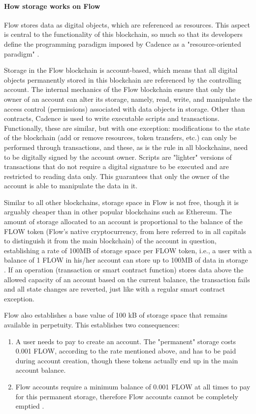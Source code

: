 \documentclass[./4_GeneralApproach.tex]{subfiles}
\begin{document}
    \paragraph{How storage works on Flow}
    Flow stores data as digital objects, which are referenced as resources. This aspect is central to the functionality of this blockchain, so much so that its developers define the programming paradigm imposed by Cadence as a "resource-oriented paradigm" \cite{flow2024}.
    \par
    Storage in the Flow blockchain is account-based, which means that all digital objects permanently stored in this blockchain are referenced by the controlling account. The internal mechanics of the Flow blockchain ensure that only the owner of an account can alter its storage, namely, read, write, and manipulate the access control (permissions) associated with data objects in storage. Other than contracts, Cadence is used to write executable scripts and transactions. Functionally, these are similar, but with one exception: modifications to the state of the blockchain (add or remove resources, token transfers, etc.) can only be performed through transactions, and these, as is the rule in all blockchains, need to be digitally signed by the account owner. Scripts are "lighter" versions of transactions that do not require a digital signature to be executed and are restricted to reading data only. This guarantees that only the owner of the account is able to manipulate the data in it.
    \par
    Similar to all other blockchains, storage space in Flow is not free, though it is arguably cheaper than in other popular blockchains such as Ethereum. The amount of storage allocated to an account is proportional to the balance of the FLOW token (Flow's native cryptocurrency, from here referred to in all capitals to distinguish it from the main blockchain) of the account in question, establishing a rate of 100MB of storage space per FLOW token, i.e., a user with a balance of 1 FLOW in his/her account can store up to 100MB of data in storage \cite{flow2024}. If an operation (transaction or smart contract function) stores data above the allowed capacity of an account based on the current balance, the transaction fails and all state changes are reverted, just like with a regular smart contract exception.
    \par
    Flow also establishes a base value of 100 kB of storage space that remains available in perpetuity. This establishes two consequences:
    \begin{enumerate}
        \item {A user needs to pay to create an account. The "permanent" storage costs 0.001 FLOW, according to the rate mentioned above, and has to be paid during account creation, though these tokens actually end up in the main account balance.}
        \item {Flow accounts require a minimum balance of 0.001 FLOW at all times to pay for this permanent storage, therefore Flow accounts cannot be completely emptied \cite{flow2024}.}
    \end{enumerate}
\end{document}
